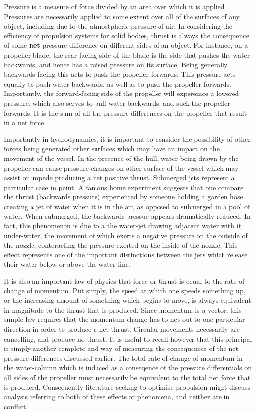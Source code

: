 \documentclass{article}\usepackage[]{graphicx}\usepackage[]{color}
\begin{document}
Pressure is a measure of force divided by an area over which it is applied. Pressures are necessarily applied to some extent over all of the surfaces of any object, including due to the atmostpheric pressure of air.  In considering the efficiency of propulsion systems for solid bodies, thrust is always the consequence of some \textbf{net} pressure difference on different sides of an object.  For instance, on a propeller blade, the rear-facing side of the blade is the side that pushes the water backwards, and hence has a raised pressure on its surface.  Being generally backwards facing this acts to push the propeller forwards.  This pressure acts equally to push water backwards, as well as to push the propeller forwards.  Importantly, the forward-facing side of the propeller will expereince a lowered pressure, which also serves to pull water backwards, and suck the propeller forwards.  It is the sum of all the pressure differences on the propeller that result in a net force.

Importantly in hydrodynamics, it is important to consider the possibility of other forces being generated other surfaces which may have an impact on the movement of the vessel.  In the presence of the hull, water being drawn by the propeller can cause pressure changes on other surface of the vessel which may assist or impede producing a net positive thrust.  Submerged jets represent a particular case in point.  A famous home experiment suggests that one compare the thrust (backwards pressure) experienced by someone holding a garden hose creating a jet of water when it is in the air, as opposed to submerged in a pool of water.  When submerged, the backwards pressue appears dramatically reduced.  In fact, this phenomenon is due to a the water-jet drawing adjacent water with it under-water, the movement of which exerts a negative pressure on the outside of the nozzle, conteracting the pressure exerted on the inside of the nozzle. This effect represents one of the important distinctions between the jets which release their water below or above the water-line.

It is also an important law of physics that force or thrust is equal to the rate of change of momentum. Put simply, the speed at which one speeds something up, or the increasing amount of something which begins to move, is always equivalent in magnitude to the thrust that is produced.  Since momentum is a vector, this simple law requires that the momentum change has to net out to one particular direction in order to produce a net thrust.  Circular movements necessarily are cancelling, and produce no thrust. It is useful to recall however that this principal is simply another complete and way of measuring the consequences of the net pressure differences discussed earlier.  The total rate of change of momentum in the water-column which is induced as a conseqence of the pressure differentials on all sides of the propeller must necessarily be equivalent to the total net force that is produced.  Consequently literature seeking to optimise propulsion might discuss analysis referring to both of these effects or phenomena, and neither are in conflict.
\end{document}
